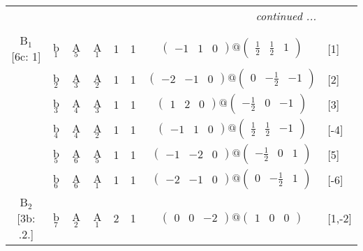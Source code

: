 \documentclass[fleqn,10pt,landscape]{article}
\begin{document}
\begin{itemize}
\begin{center}
\begin{longtable}{cc|cc|c|c|c|l}
 \hline \hline
\multicolumn{7}{r}{\footnotesize\it continued ...} \\ \endfoot

 \hline \hline
\multicolumn{7}{r}{} \\ \endlastfoot

B$_{1}$ [6c: 1] & b$_{1}$ & A$_{5}$ & A$_{1}$ & 1 & 1 & $\begin{pmatrix} -1 & 1 & 0 \end{pmatrix}@\begin{pmatrix} \frac{1}{2} & \frac{1}{2} & 1 \end{pmatrix}$ & [1] \\
& b$_{2}$ & A$_{3}$ & A$_{2}$ & 1 & 1 & $\begin{pmatrix} -2 & -1 & 0 \end{pmatrix}@\begin{pmatrix} 0 & - \frac{1}{2} & -1 \end{pmatrix}$ & [2] \\
& b$_{3}$ & A$_{4}$ & A$_{3}$ & 1 & 1 & $\begin{pmatrix} 1 & 2 & 0 \end{pmatrix}@\begin{pmatrix} - \frac{1}{2} & 0 & -1 \end{pmatrix}$ & [3] \\
& b$_{4}$ & A$_{4}$ & A$_{2}$ & 1 & 1 & $\begin{pmatrix} -1 & 1 & 0 \end{pmatrix}@\begin{pmatrix} \frac{1}{2} & \frac{1}{2} & -1 \end{pmatrix}$ & [-4] \\
& b$_{5}$ & A$_{6}$ & A$_{5}$ & 1 & 1 & $\begin{pmatrix} -1 & -2 & 0 \end{pmatrix}@\begin{pmatrix} - \frac{1}{2} & 0 & 1 \end{pmatrix}$ & [5] \\
& b$_{6}$ & A$_{6}$ & A$_{1}$ & 1 & 1 & $\begin{pmatrix} -2 & -1 & 0 \end{pmatrix}@\begin{pmatrix} 0 & - \frac{1}{2} & 1 \end{pmatrix}$ & [-6] \\ \hline
B$_{2}$ [3b: .2.] & b$_{7}$ & A$_{2}$ & A$_{1}$ & 2 & 1 & $\begin{pmatrix} 0 & 0 & -2 \end{pmatrix}@\begin{pmatrix} 1 & 0 & 0 \end{pmatrix}$ & [1,-2] \\

\end{longtable}
\end{center}
\end{itemize}
\end{document}
